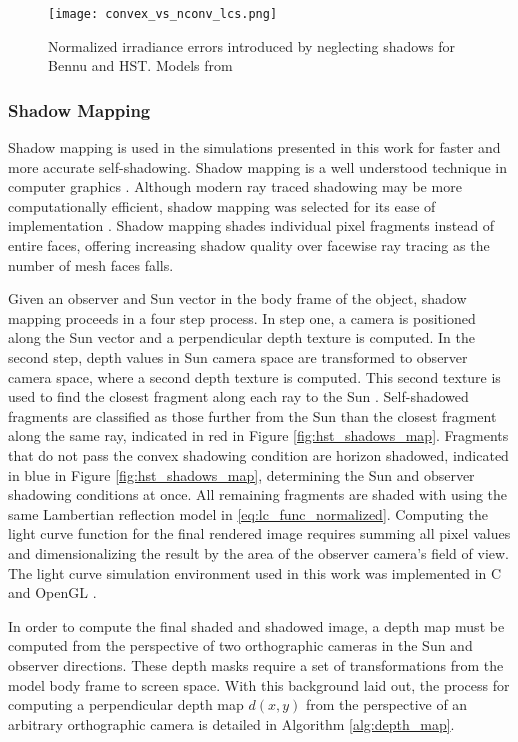 \begin{figure}[!htb]
  \centering
  \texttt{[image: convex\_vs\_nconv\_lcs.png]}
  \caption{Normalized irradiance errors introduced by neglecting shadows for Bennu and HST. Models from \cite{nasa_models}}
  \label{fig:hst_bennu_shadows}
\end{figure}

\subsubsection{Shadow Mapping} \label{sec:shadow_mapping}

Shadow mapping is used in the simulations presented in this work for faster and more accurate self-shadowing. Shadow mapping is a well understood technique in computer graphics \cite{kolivand2013}. Although modern ray traced shadowing may be more computationally efficient, shadow mapping was selected for its ease of implementation \cite{kolivand2013}. Shadow mapping shades individual pixel fragments instead of entire faces, offering increasing shadow quality over facewise ray tracing as the number of mesh faces falls.

Given an observer and Sun vector in the body frame of the object, shadow mapping proceeds in a four step process. In step one, a camera is positioned along the Sun vector and a perpendicular depth texture is computed. In the second step, depth values in Sun camera space are transformed to observer camera space, where a second depth texture is computed. This second texture is used to find the closest fragment along each ray to the Sun \cite{brabec2002}. Self-shadowed fragments are classified as those further from the Sun than the closest fragment along the same ray, indicated in red in Figure \ref{fig:hst_shadows_map}. Fragments that do not pass the convex shadowing condition are horizon shadowed, indicated in blue in Figure \ref{fig:hst_shadows_map}, determining the Sun and observer shadowing conditions at once. All remaining fragments are shaded with using the same Lambertian reflection model in \ref{eq:lc_func_normalized}. Computing the light curve function for the final rendered image requires summing all pixel values and dimensionalizing the result by the area of the observer camera's field of view. The light curve simulation environment used in this work was implemented in C and OpenGL \cite{raylib}.

In order to compute the final shaded and shadowed image, a depth map must be computed from the perspective of two orthographic cameras in the Sun and observer directions. These depth masks require a set of transformations from the model body frame to screen space. With this background laid out, the process for computing a perpendicular depth map $d(x,y)$ from the perspective of an arbitrary orthographic camera is detailed in Algorithm \ref{alg:depth_map}.

